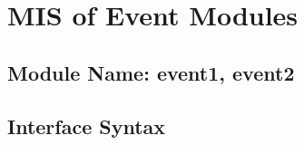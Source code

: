 \documentclass[12pt]{article}
\begin{document}
\section{MIS of Event Modules}

\subsection{Module Name: event1, event2}





\subsection{Interface Syntax}


\end{document}
